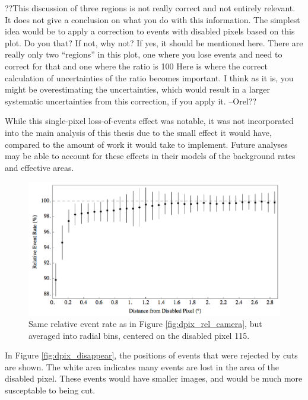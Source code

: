     {\color{red}
    ??This discussion of three regions is not really correct and not entirely relevant.
    It does not give a conclusion on what you do with this information.
    The simplest idea would be to apply a correction to events with disabled pixels based on this plot. Do you that? If not, why not? If yes, it should be mentioned here.
    There are really only two “regions” in this plot, one where you lose events and need to correct for that and one where the ratio is 100%
    Here is where the correct calculation of uncertainties of the ratio becomes important.
    I think as it is, you might be overestimating the uncertainties, which would result in a larger systematic uncertainties from this correction, if you apply it. --Orel??
    }
    
    While this single-pixel loss-of-events effect was notable, it was not incorporated into the main analysis of this thesis due to the small effect it would have, compared to the amount of work it would take to implement.
    Future analyses may be able to account for these effects in their models of the background rates and effective areas.


    \begin{figure}[ht]
      \centering
      \includegraphics[width=\textwidth]{images/disabled_pixel/relativerate_radial}
      \caption[Radial Relative Event Rate]{
        Same relative event rate as in Figure \ref{fig:dpix_rel_camera}, but averaged into radial bins, centered on the disabled pixel 115.
      }
      \label{fig:dpix_rel_radial}
    \end{figure}

    In Figure \ref{fig:dpix_disappear}, the positions of events that were rejected by cuts are shown.
    The white area indicates many events are lost in the area of the disabled pixel.
    These events would have smaller images, and would be much more susceptable to being cut.

